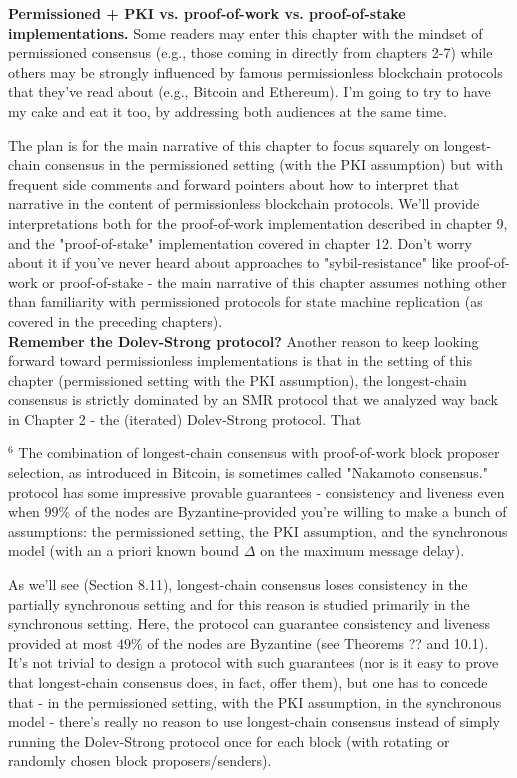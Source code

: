 \noindent
\textbf{Permissioned + PKI vs. proof-of-work vs. proof-of-stake implementations.} Some readers may enter this chapter with the mindset of permissioned consensus (e.g., those coming in directly from chapters 2-7) while others may be strongly influenced by famous permissionless blockchain protocols that they've read about (e.g., Bitcoin and Ethereum). I'm going to try to have my cake and eat it too, by addressing both audiences at the same time.

The plan is for the main narrative of this chapter to focus squarely on longest-chain consensus in the permissioned setting (with the PKI assumption) but with frequent side comments and forward pointers about how to interpret that narrative in the content of permissionless blockchain protocols. We'll provide interpretations both for the proof-of-work implementation described in chapter 9, and the "proof-of-stake" implementation covered in chapter 12. Don't worry about it if you've never heard about approaches to "sybil-resistance" like proof-of-work or proof-of-stake - the main narrative of this chapter assumes nothing other than familiarity with permissioned protocols for state machine replication (as covered in the preceding chapters).\\

\noindent
\textbf{Remember the Dolev-Strong protocol?} Another reason to keep looking forward toward permissionless implementations is that in the setting of this chapter (permissioned setting with the PKI assumption), the longest-chain consensus is strictly dominated by an SMR protocol that we analyzed way back in Chapter 2 - the (iterated) Dolev-Strong protocol. That

${ }^{6}$ The combination of longest-chain consensus with proof-of-work block proposer selection, as introduced in Bitcoin, is sometimes called "Nakamoto consensus." protocol has some impressive provable guarantees - consistency and liveness even when $99 \%$ of the nodes are Byzantine-provided you're willing to make a bunch of assumptions: the permissioned setting, the PKI assumption, and the synchronous model (with an a priori known bound $\Delta$ on the maximum message delay).

As we'll see (Section 8.11), longest-chain consensus loses consistency in the partially synchronous setting and for this reason is studied primarily in the synchronous setting. Here, the protocol can guarantee consistency and liveness provided at most $49 \%$ of the nodes are Byzantine (see Theorems ?? and 10.1). It's not trivial to design a protocol with such guarantees (nor is it easy to prove that longest-chain consensus does, in fact, offer them), but one has to concede that - in the permissioned setting, with the PKI assumption, in the synchronous model - there's really no reason to use longest-chain consensus instead of simply running the Dolev-Strong protocol once for each block (with rotating or randomly chosen block proposers/senders).

